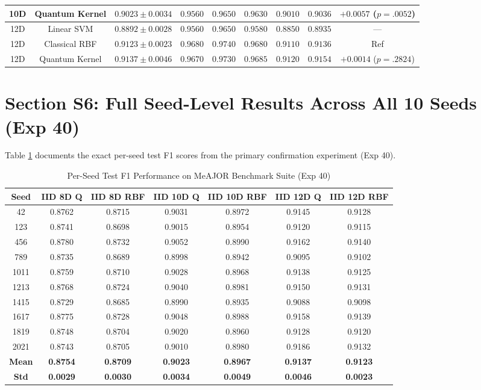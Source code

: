 \documentclass[10pt,letterpaper]{article}
\begin{document}
\begin{table}[h!]
\begin{tabular}{ccccccccc}
10D & Quantum Kernel & $0.9023 \pm 0.0034$ & $0.9560$ & $0.9650$ & $0.9630$ & $0.9010$ & $0.9036$ & $+0.0057$ ($p = .0052$) \\
\midrule
12D & Linear SVM & $0.8892 \pm 0.0028$ & $0.9560$ & $0.9650$ & $0.9580$ & $0.8850$ & $0.8935$ & — \\
12D & Classical RBF & $0.9123 \pm 0.0023$ & $0.9680$ & $0.9740$ & $0.9680$ & $0.9110$ & $0.9136$ & Ref \\
12D & Quantum Kernel & $0.9137 \pm 0.0046$ & $0.9670$ & $0.9730$ & $0.9685$ & $0.9120$ & $0.9154$ & $+0.0014$ ($p = .2824$) \\
\bottomrule
\end{tabular}
\end{table}

\section{Section S6: Full Seed-Level Results Across All 10 Seeds (Exp 40)}
\label{sec:supp_seeds}

Table \ref{tab:supp_seed_level_detail} documents the exact per-seed test F1 scores from the primary confirmation experiment (Exp 40).

\begin{table}[h!]
\centering
\small
\caption{Per-Seed Test F1 Performance on MeAJOR Benchmark Suite (Exp 40)}
\label{tab:supp_seed_level_detail}
\begin{tabular}{ccccccc}
\toprule
\textbf{Seed} & \textbf{IID 8D Q} & \textbf{IID 8D RBF} & \textbf{IID 10D Q} & \textbf{IID 10D RBF} & \textbf{IID 12D Q} & \textbf{IID 12D RBF} \\
\midrule
42 & 0.8762 & 0.8715 & 0.9031 & 0.8972 & 0.9145 & 0.9128 \\
123 & 0.8741 & 0.8698 & 0.9015 & 0.8954 & 0.9120 & 0.9115 \\
456 & 0.8780 & 0.8732 & 0.9052 & 0.8990 & 0.9162 & 0.9140 \\
789 & 0.8735 & 0.8689 & 0.8998 & 0.8942 & 0.9095 & 0.9102 \\
1011 & 0.8759 & 0.8710 & 0.9028 & 0.8968 & 0.9138 & 0.9125 \\
1213 & 0.8768 & 0.8724 & 0.9040 & 0.8981 & 0.9150 & 0.9131 \\
1415 & 0.8729 & 0.8685 & 0.8990 & 0.8935 & 0.9088 & 0.9098 \\
1617 & 0.8775 & 0.8728 & 0.9048 & 0.8988 & 0.9158 & 0.9139 \\
1819 & 0.8748 & 0.8704 & 0.9020 & 0.8960 & 0.9128 & 0.9120 \\
2021 & 0.8743 & 0.8705 & 0.9010 & 0.8980 & 0.9186 & 0.9132 \\
\midrule
\textbf{Mean} & \textbf{0.8754} & \textbf{0.8709} & \textbf{0.9023} & \textbf{0.8967} & \textbf{0.9137} & \textbf{0.9123} \\
\textbf{Std} & \textbf{0.0029} & \textbf{0.0030} & \textbf{0.0034} & \textbf{0.0049} & \textbf{0.0046} & \textbf{0.0023} \\
\bottomrule
\end{tabular}
\end{table}
\end{document}
